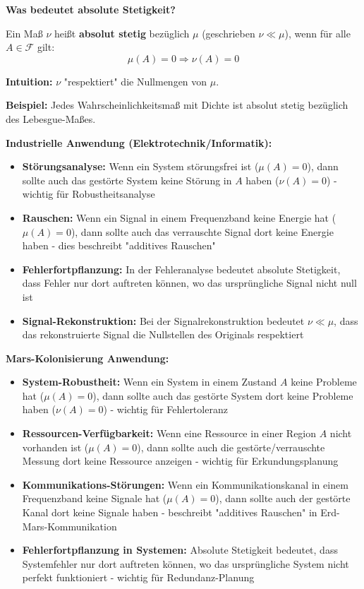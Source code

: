\begin{denoobification}
\textbf{Was bedeutet absolute Stetigkeit?}

Ein Maß $\nu$ heißt \textbf{absolut stetig} bezüglich $\mu$ (geschrieben $\nu \ll \mu$), wenn für alle $A \in \mathcal{F}$ gilt:
\[
\mu(A) = 0 \Rightarrow \nu(A) = 0
\]

\textbf{Intuition:} $\nu$ "respektiert" die Nullmengen von $\mu$.

\textbf{Beispiel:} Jedes Wahrscheinlichkeitsmaß mit Dichte ist absolut stetig bezüglich des Lebesgue-Maßes.

\textbf{Industrielle Anwendung (Elektrotechnik/Informatik):}
\begin{itemize}
    \item \textbf{Störungsanalyse:} Wenn ein System störungsfrei ist ($\mu(A) = 0$), dann sollte auch das gestörte System keine Störung in $A$ haben ($\nu(A) = 0$) - wichtig für Robustheitsanalyse
    \item \textbf{Rauschen:} Wenn ein Signal in einem Frequenzband keine Energie hat ($\mu(A) = 0$), dann sollte auch das verrauschte Signal dort keine Energie haben - dies beschreibt "additives Rauschen"
    \item \textbf{Fehlerfortpflanzung:} In der Fehleranalyse bedeutet absolute Stetigkeit, dass Fehler nur dort auftreten können, wo das ursprüngliche Signal nicht null ist
    \item \textbf{Signal-Rekonstruktion:} Bei der Signalrekonstruktion bedeutet $\nu \ll \mu$, dass das rekonstruierte Signal die Nullstellen des Originals respektiert
\end{itemize}

\textbf{Mars-Kolonisierung Anwendung:}
\begin{itemize}
    \item \textbf{System-Robustheit:} Wenn ein System in einem Zustand $A$ keine Probleme hat ($\mu(A) = 0$), dann sollte auch das gestörte System dort keine Probleme haben ($\nu(A) = 0$) - wichtig für Fehlertoleranz
    \item \textbf{Ressourcen-Verfügbarkeit:} Wenn eine Ressource in einer Region $A$ nicht vorhanden ist ($\mu(A) = 0$), dann sollte auch die gestörte/verrauschte Messung dort keine Ressource anzeigen - wichtig für Erkundungsplanung
    \item \textbf{Kommunikations-Störungen:} Wenn ein Kommunikationskanal in einem Frequenzband keine Signale hat ($\mu(A) = 0$), dann sollte auch der gestörte Kanal dort keine Signale haben - beschreibt "additives Rauschen" in Erd-Mars-Kommunikation
    \item \textbf{Fehlerfortpflanzung in Systemen:} Absolute Stetigkeit bedeutet, dass Systemfehler nur dort auftreten können, wo das ursprüngliche System nicht perfekt funktioniert - wichtig für Redundanz-Planung
\end{itemize}


\end{denoobification}
